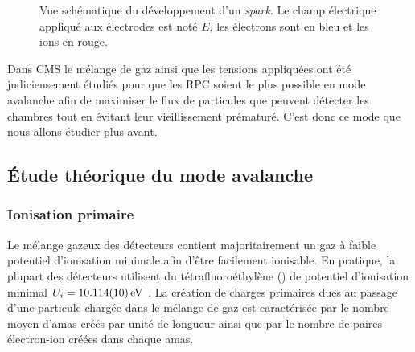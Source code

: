 \begin{figure}[ht!]
    \hfill
	\caption{Vue schématique du développement d'un \textit{spark}. Le champ électrique appliqué aux électrodes est noté $E$, les électrons sont en bleu et les ions en rouge.}
	\label{spark}
\end{figure}


Dans CMS le mélange de gaz ainsi que les tensions appliquées ont été judicieusement étudiés pour que les RPC soient le plus possible en mode avalanche afin de maximiser le flux de particules que peuvent détecter les chambres tout en évitant leur vieillissement prématuré. C'est donc ce mode que nous allons étudier plus avant.

\subsection{Étude théorique du mode avalanche}

\subsubsection{Ionisation primaire}
Le mélange gazeux des détecteurs contient majoritairement un gaz à faible potentiel d'ionisation minimale afin d'être facilement ionisable. En pratique, la plupart des détecteurs utilisent du tétrafluoroéthylène () de potentiel d'ionisation minimal $U_{i}=\SI{10.114 \pm0.010}{\eV}$ \cite{Chimie:chimie}. La création de charges primaires dues au passage d'une particule chargée dans le mélange de gaz est caractérisée par le nombre moyen d'amas créés par unité de longueur ainsi que par le nombre de paires électron-ion créées dans chaque amas.

